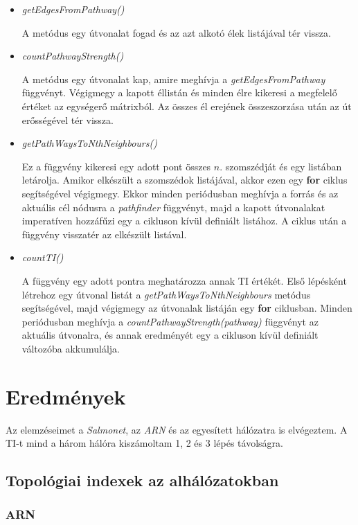 \documentclass[a4paper,12pt]{article}
\begin{document}
\begin{itemize}
			\item \textit{getEdgesFromPathway()}

			A metódus egy útvonalat fogad és az azt alkotó élek listájával tér vissza.

			\item \textit{countPathwayStrength()}

			A metódus egy útvonalat kap, amire meghívja a \textit{getEdgesFromPathway} függvényt. Végigmegy a kapott éllistán és minden élre kikeresi a megfelelő értéket az egységerő mátrixból. Az összes él erejének összeszorzása után az út erősségével tér vissza.

			\item \textit{getPathWaysToNthNeighbours()}

			Ez a függvény kikeresi egy adott pont összes $n$. szomszédját és egy listában letárolja. Amikor elkészült a szomszédok listájával, akkor ezen egy \textbf{for} ciklus segítségével végigmegy. Ekkor minden periódusban meghívja a forrás és az aktuális cél nódusra a \textit{pathfinder} függvényt, majd a kapott útvonalakat imperatíven hozzáfűzi egy a cikluson kívül definiált listához. A ciklus után a függvény visszatér az elkészült listával.

			\item \textit{countTI()}

			A függvény egy adott pontra meghatározza annak TI értékét. Első lépésként létrehoz egy útvonal listát a \textit{getPathWaysToNthNeighbours} metódus segítségével, majd végigmegy az útvonalak listáján egy \textbf{for} ciklusban. Minden periódusban meghívja a \textit{countPathwayStrength(pathway)} függvényt az aktuális útvonalra, és annak eredményét egy a cikluson kívül definiált változóba akkumulálja.

		\end{itemize}
		\pagebreak


\section{Eredmények}

	Az elemzéseimet a \textit{Salmonet}, az \textit{ARN} és az egyesített hálózatra is elvégeztem. A TI-t mind a három hálóra kiszámoltam 1, 2 és 3 lépés távolságra.

	\subsection{Topológiai indexek az alhálózatokban}
		\subsubsection{ARN}
\end{document}
